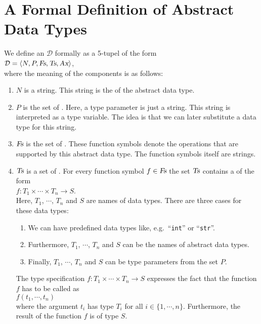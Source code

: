 \section[Formal Definition]{A Formal Definition of Abstract Data Types}
We define an  $\mathcal{D}$ formally as a 5-tupel of the form 
\\[0.2cm]
\hspace*{1.3cm}
 $\mathcal{D} = \langle N, P, \textsl{Fs}, \textsl{Ts}, \textsl{Ax} \rangle$,
\\[0.2cm] 
where the meaning of the components is as follows:
\begin{enumerate}
\item $N$ is a string.  This string is the  of the abstract data type. 
\item $P$ is the set of .   Here, a type parameter is just a string.
      This string is interpreted as a type variable.  The idea is that we can later substitute 
      a data type for this string. 
\item $\textsl{Fs}$ is the set of .  These function symbols denote the 
      operations that are supported by this abstract data type. The function symbols itself are strings.
\item $\textsl{Ts}$ is a set of .  For every function symbol
      $f \in \textsl{Fs}$
      the set $\textsl{Ts}$ contains a  of the form 
      \\[0.2cm]
      \hspace*{1.3cm} 
      $f: T_1 \times \cdots \times T_n \rightarrow S$. 
      \\[0.2cm]
      Here,  $T_1$, $\cdots$, $T_n$ and $S$ are names of data types.  There are three cases for
      these data types: 
      \begin{enumerate}
      \item We can have predefined data types like, e.g.~``\texttt{int}'' or ``\texttt{str}''.
      \item Furthermore, $T_1$, $\cdots$, $T_n$ and $S$ can be the names of abstract data types.
      \item Finally,  $T_1$, $\cdots$, $T_n$ and $S$ can be type parameters from the set $P$.
      \end{enumerate}
      The type specification $f: T_1 \times \cdots \times T_n \rightarrow S$ expresses the fact that
      the function $f$ has to be called as \\[0.2cm] 
      \hspace*{1.3cm}
      $f(t_1,\cdots,t_n)$ 
      \\[0.2cm]
      where the argument $t_i$ has type $T_i$ for all $i \in \{1,\cdots,n\}$.
      Furthermore, the result of the function $f$ is of type $S$.


\end{enumerate}
